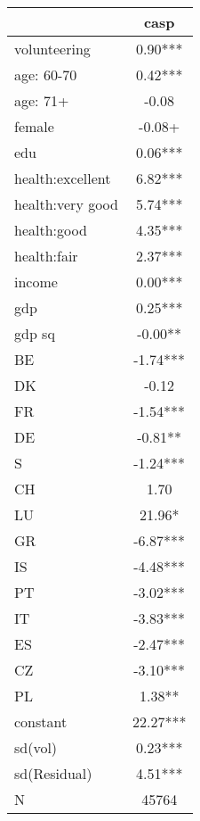 {
\def\sym#1{\ifmmode^{#1}\else\(^{#1}\)\fi}
\begin{tabular}{l*{1}{c}}
\hline\hline
            &\multicolumn{1}{c}{casp}\\
\hline
volunteering&        0.90***\\
age: 60-70  &        0.42***\\
age: 71+    &       -0.08   \\
female      &       -0.08+  \\
edu         &        0.06***\\
health:excellent&        6.82***\\
health:very good&        5.74***\\
health:good &        4.35***\\
health:fair &        2.37***\\
income      &        0.00***\\
gdp         &        0.25***\\
gdp sq      &       -0.00** \\
BE          &       -1.74***\\
DK          &       -0.12   \\
FR          &       -1.54***\\
DE          &       -0.81** \\
S           &       -1.24***\\
CH          &        1.70   \\
LU          &       21.96*  \\
GR          &       -6.87***\\
IS          &       -4.48***\\
PT          &       -3.02***\\
IT          &       -3.83***\\
ES          &       -2.47***\\
CZ          &       -3.10***\\
PL          &        1.38** \\
constant    &       22.27***\\
sd(vol)     &        0.23***\\
sd(Residual)&        4.51***\\
\hline
N           &       45764   \\
\hline\hline
\end{tabular}
}
